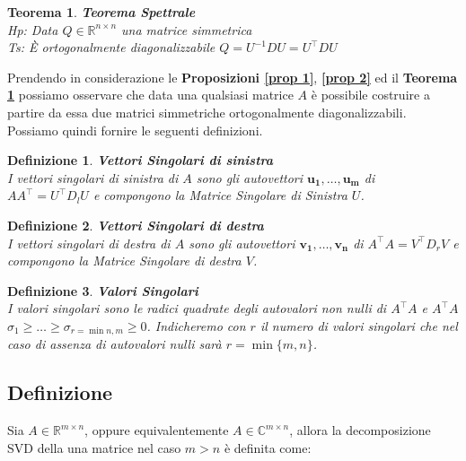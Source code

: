 \documentclass[11pt]{article}
\newtheorem{theorem}{Teorema}
\newtheorem{definition}{Definizione}
\begin{document}
\begin{theorem}\label{teo spetr}
\textbf{Teorema Spettrale}\\
\textit{Hp:} Data $Q\in\mathbb{R}^{n\times n}$ una matrice simmetrica\\
\textit{Ts:} È ortogonalmente diagonalizzabile $Q=U^{-1}DU=U^\top      DU$
\end{theorem}
\noindent
Prendendo in considerazione le \textbf{Proposizioni \autoref{prop 1}}, \textbf{\autoref{prop 2}} ed il \textbf{Teorema \ref{teo spetr}} possiamo osservare che data una qualsiasi matrice $A$ è possibile costruire a partire da essa due matrici simmetriche ortogonalmente diagonalizzabili. Possiamo quindi fornire le seguenti definizioni.
\begin{definition}
	\textbf{Vettori Singolari di sinistra}\\ I vettori singolari di sinistra di $A$ sono gli autovettori $\mathbf{u_1, \dots ,u_m}$ di $AA^\top      =U^\top      D_lU$ e compongono la \textit{Matrice Singolare di Sinistra} $U$.
\end{definition}
\begin{definition}
	\textbf{Vettori Singolari di destra}\\ I vettori singolari di destra di $A$ sono gli autovettori $\mathbf{v_1, \dots ,v_n}$ di $A^\top      A=V^\top      D_rV$ e compongono la \textit{Matrice Singolare di destra} $V$.
\end{definition}
\begin{definition}
	\textbf{Valori Singolari}\\ I valori singolari sono le radici quadrate degli autovalori non nulli di $A^\top      A$ e $A^\top      A$\\ $\sigma_1 \geq \dots \geq \sigma_{r=\min{n,m}} \geq 0$. Indicheremo con $r$ il numero di valori singolari che nel caso di assenza di autovalori nulli sarà $r=\min{\{m,n\}}$.
\end{definition}

\subsection{Definizione}
Sia $A\in\mathbb{R}^{m\times n}$, oppure equivalentemente $A\in\mathbb{C}^{m\times n}$, allora la decomposizione SVD della una matrice nel caso $m>n$ è definita come:
\end{document}

